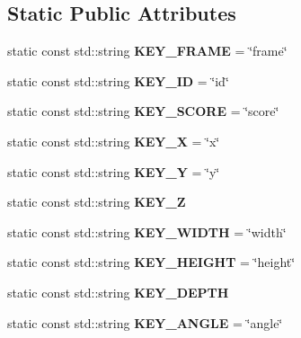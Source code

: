 \subsection*{Static Public Attributes}
\begin{DoxyCompactItemize}
\item 
static const std\+::string {\bfseries K\+E\+Y\+\_\+\+F\+R\+A\+ME} = \char`\"{}frame\char`\"{}\hypertarget{classutil_1_1Parser_a9fd08e7f29329a2d5b67e466f6f561ea}{}\label{classutil_1_1Parser_a9fd08e7f29329a2d5b67e466f6f561ea}

\item 
static const std\+::string {\bfseries K\+E\+Y\+\_\+\+ID} = \char`\"{}id\char`\"{}\hypertarget{classutil_1_1Parser_a82822b70cb89a7d402c8ebfbbc656047}{}\label{classutil_1_1Parser_a82822b70cb89a7d402c8ebfbbc656047}

\item 
static const std\+::string {\bfseries K\+E\+Y\+\_\+\+S\+C\+O\+RE} = \char`\"{}score\char`\"{}\hypertarget{classutil_1_1Parser_aea01dc9348cb59860fb279b716d3cf72}{}\label{classutil_1_1Parser_aea01dc9348cb59860fb279b716d3cf72}

\item 
static const std\+::string {\bfseries K\+E\+Y\+\_\+X} = \char`\"{}x\char`\"{}\hypertarget{classutil_1_1Parser_a67cac8af9b52947d6984d64a56ac4ad3}{}\label{classutil_1_1Parser_a67cac8af9b52947d6984d64a56ac4ad3}

\item 
static const std\+::string {\bfseries K\+E\+Y\+\_\+Y} = \char`\"{}y\char`\"{}\hypertarget{classutil_1_1Parser_aa13293b6680f1bec5532247c14acf85f}{}\label{classutil_1_1Parser_aa13293b6680f1bec5532247c14acf85f}

\item 
static const std\+::string {\bfseries K\+E\+Y\+\_\+Z}\hypertarget{classutil_1_1Parser_a33c7c6efa60e5881ebf497851b56b493}{}\label{classutil_1_1Parser_a33c7c6efa60e5881ebf497851b56b493}

\item 
static const std\+::string {\bfseries K\+E\+Y\+\_\+\+W\+I\+D\+TH} = \char`\"{}width\char`\"{}\hypertarget{classutil_1_1Parser_af460fb066f6dede3b0e3aa0ea97ac115}{}\label{classutil_1_1Parser_af460fb066f6dede3b0e3aa0ea97ac115}

\item 
static const std\+::string {\bfseries K\+E\+Y\+\_\+\+H\+E\+I\+G\+HT} = \char`\"{}height\char`\"{}\hypertarget{classutil_1_1Parser_a819fb19f3d743320864fcc125b9c40eb}{}\label{classutil_1_1Parser_a819fb19f3d743320864fcc125b9c40eb}

\item 
static const std\+::string {\bfseries K\+E\+Y\+\_\+\+D\+E\+P\+TH}\hypertarget{classutil_1_1Parser_a4add600ddc8287c10285bbae8ccd4ef1}{}\label{classutil_1_1Parser_a4add600ddc8287c10285bbae8ccd4ef1}

\item 
static const std\+::string {\bfseries K\+E\+Y\+\_\+\+A\+N\+G\+LE} = \char`\"{}angle\char`\"{}\hypertarget{classutil_1_1Parser_a03362a18612fcb3ca7c01cfcb6652521}{}\label{classutil_1_1Parser_a03362a18612fcb3ca7c01cfcb6652521}

\end{DoxyCompactItemize}


